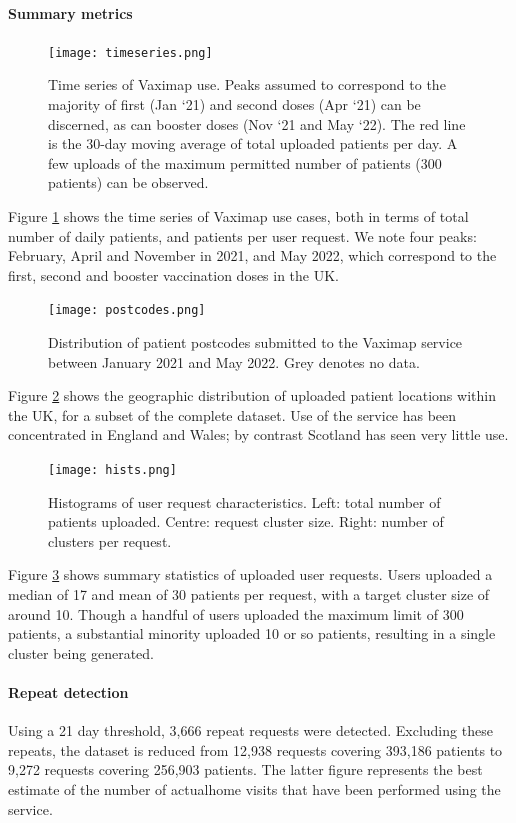 \documentclass{article}
\def\vm{Vaximap}
\begin{document}
\paragraph{Summary metrics}
\begin{figure}[H]
\centering
\texttt{[image: timeseries.png]}
\caption{Time series of \vm{} use. Peaks assumed to correspond to the majority of first (Jan `21) and second doses (Apr `21) can be discerned, as can booster doses (Nov  `21 and May `22). The red line is the 30-day moving average of total uploaded patients per day. A few uploads of the maximum permitted number of patients (300 patients) can be observed.}
\label{timeseries}
\end{figure}

Figure \ref{timeseries} shows the time series of \vm{} use cases, both in terms of total number of daily patients, and patients per user request. We note four peaks: February, April and November in 2021, and May 2022, which correspond to the first, second and booster vaccination doses in the UK.

\begin{figure}[H]
\centering
\texttt{[image: postcodes.png]}
\caption{Distribution of patient postcodes submitted to the \vm{} service between January 2021 and May 2022. Grey denotes no data.}
\label{uk_overview}
\end{figure}

Figure \ref{uk_overview} shows the geographic distribution of uploaded patient locations within the UK, for a subset of the complete dataset. Use of the service has been concentrated in England and Wales; by contrast Scotland has seen very little use.  

\begin{figure}[H]
\centering
\texttt{[image: hists.png]}
\caption{Histograms of user request characteristics. Left: total number of patients uploaded. Centre: request cluster size. Right: number of clusters per request.}
\label{hists}
\end{figure}

Figure \ref{hists} shows summary statistics of uploaded user requests. Users uploaded a median of 17 and mean of 30 patients per request, with a target cluster size of around 10. Though a handful of users uploaded the maximum limit of 300 patients, a substantial minority uploaded 10 or so patients, resulting in a single cluster being generated. 

\paragraph{Repeat detection}
Using a 21 day threshold, 3,666 repeat requests were detected. Excluding these repeats, the dataset is reduced from 12,938 requests covering 393,186 patients to 9,272 requests covering 256,903 patients. The latter figure represents the best estimate of the number of actualhome visits that have been performed using the service. 
\end{document}

